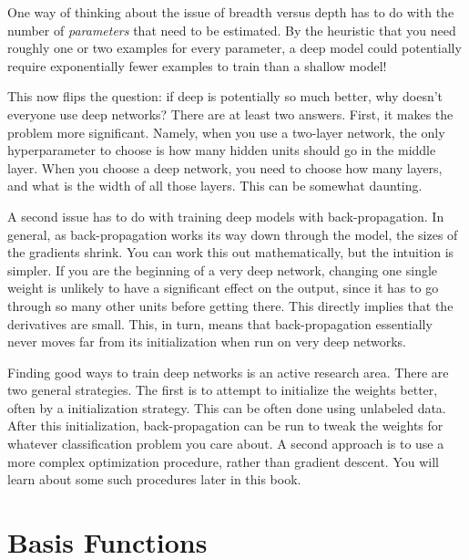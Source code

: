 
One way of thinking about the issue of breadth versus depth has to do
with the number of \emph{parameters} that need to be estimated.  By
the heuristic that you need roughly one or two examples for every
parameter, a deep model could potentially require exponentially fewer
examples to train than a shallow model!

This now flips the question: if deep is potentially so much better,
why doesn't everyone use deep networks?  There are at least two
answers.  First, it makes the  problem
more significant.  Namely, when you use a two-layer network, the only
hyperparameter to choose is how many hidden units should go in the
middle layer.  When you choose a deep network, you need to choose how
many layers, and what is the width of all those layers.  This can be
somewhat daunting.

A second issue has to do with training deep models with
back-propagation.  In general, as back-propagation works its way down
through the model, the sizes of the gradients shrink.  You can work
this out mathematically, but the intuition is simpler.  If you are the
beginning of a very deep network, changing one single weight is
unlikely to have a significant effect on the output, since it has to
go through so many other units before getting there.  This directly
implies that the derivatives are small.  This, in turn, means that
back-propagation essentially never moves far from its initialization
when run on very deep networks.


Finding good ways to train deep networks is an active research area.
There are two general strategies.  The first is to attempt to
initialize the weights better, often by a 
initialization strategy.  This can be often done using unlabeled data.
After this initialization, back-propagation can be run to tweak the
weights for whatever classification problem you care about.  A second
approach is to use a more complex optimization procedure, rather than
gradient descent.  You will learn about some such procedures later in
this book.

\section{Basis Functions}

